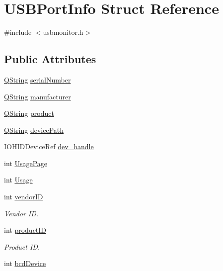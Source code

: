 \hypertarget{struct_u_s_b_port_info}{\section{\-U\-S\-B\-Port\-Info \-Struct \-Reference}
\label{struct_u_s_b_port_info}
}


{\ttfamily \#include $<$usbmonitor.\-h$>$}

\subsection*{\-Public \-Attributes}
\begin{DoxyCompactItemize}
\item 
\hyperlink{group___u_a_v_objects_plugin_gab9d252f49c333c94a72f97ce3105a32d}{\-Q\-String} \hyperlink{group___raw_h_i_d_plugin_ga2169d1d082c17498883e6c0497aecb94}{serial\-Number}
\item 
\hyperlink{group___u_a_v_objects_plugin_gab9d252f49c333c94a72f97ce3105a32d}{\-Q\-String} \hyperlink{group___raw_h_i_d_plugin_ga2ab42268838049538e60aa4a7aa3d305}{manufacturer}
\item 
\hyperlink{group___u_a_v_objects_plugin_gab9d252f49c333c94a72f97ce3105a32d}{\-Q\-String} \hyperlink{group___raw_h_i_d_plugin_ga8b2fb49e267664c4838e1205f57538d8}{product}
\item 
\hyperlink{group___u_a_v_objects_plugin_gab9d252f49c333c94a72f97ce3105a32d}{\-Q\-String} \hyperlink{group___raw_h_i_d_plugin_ga36eeebfb55ca4f88026f111f51793d18}{device\-Path}
\item 
\-I\-O\-H\-I\-D\-Device\-Ref \hyperlink{group___raw_h_i_d_plugin_gaa788f428f81fe24d5fd83a27fc3761c2}{dev\-\_\-handle}
\item 
int \hyperlink{group___raw_h_i_d_plugin_gaf3ad5590777743b25c22c4f07fd897c0}{\-Usage\-Page}
\item 
int \hyperlink{group___raw_h_i_d_plugin_ga8d2e5748b1fc39dcfaf4d3fc4aba9375}{\-Usage}
\item 
int \hyperlink{group___raw_h_i_d_plugin_ga506f2c8d425d78dd0ad899f8e5740729}{vendor\-I\-D}
\begin{DoxyCompactList}\small\item\em \-Vendor \-I\-D. \end{DoxyCompactList}\item 
int \hyperlink{group___raw_h_i_d_plugin_ga5bcd5b32d008f2c5cd5a6d3b7ec23b97}{product\-I\-D}
\begin{DoxyCompactList}\small\item\em \-Product \-I\-D. \end{DoxyCompactList}\item 
int \hyperlink{group___raw_h_i_d_plugin_ga546927dd722c593c7acfca1cb045494d}{bcd\-Device}
\end{DoxyCompactItemize}


